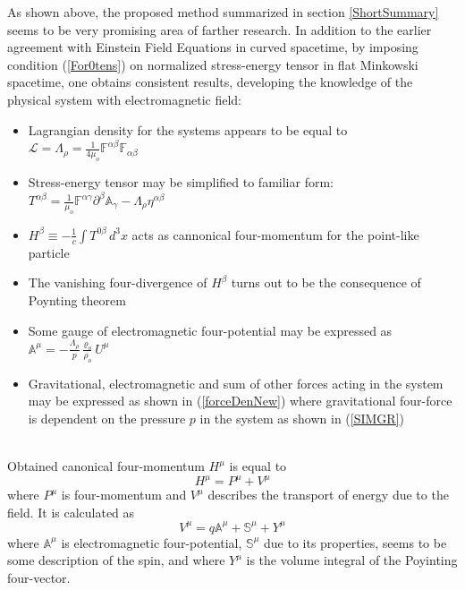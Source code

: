 \documentclass[aps,prx,preprint,groupedaddress,showkeys]{revtex4-2}
\begin{document}
As shown above, the proposed method summarized in section \ref{ShortSummary} seems to be very promising area of farther research. In addition to the earlier agreement with Einstein Field Equations in curved spacetime, by imposing condition (\ref{For0tens}) on normalized stress-energy tensor in flat Minkowski spacetime, one obtains consistent results, developing the knowledge of the physical system with electromagnetic field:
\begin{itemize}
  \item Lagrangian density for the systems appears to be equal to $\mathcal{L} = \Lambda_{\rho} = \frac{1}{4\mu_o} \mathbb{F}^{\alpha \beta} \mathbb{F}_{\alpha \beta} $
  \item Stress-energy tensor may be simplified to familiar form: $T^{\alpha \beta} = \frac{1}{\mu_o}\mathbb{F}^{\alpha \gamma} \partial^{\beta} \mathbb{A}_{\gamma} -  \Lambda_{\rho} \eta^{\alpha \beta}$
  \item $H^{\beta} \equiv - \frac{1}{c} \int T^{0 \beta} \, d^3 x$ acts as cannonical four-momentum for the point-like particle
  \item The vanishing four-divergence of $H^{\beta}$ turns out to be the consequence of Poynting theorem
  \item Some gauge of electromagnetic four-potential may be expressed as $\mathbb{A}^{\mu} = - \frac{\Lambda_{\rho}}{p} \frac{\varrho_o}{\rho_o} U^{\mu}$
  \item Gravitational, electromagnetic and sum of other forces acting in the system may be expressed as shown in (\ref{forceDenNew}) where gravitational four-force is dependent on the pressure $p$ in the system as shown in (\ref{SIMGR}) 
\end{itemize}
~\\
Obtained canonical four-momentum $H^{\mu}$ is equal to  
\begin{equation} \label{Q2}
H^{\mu} = P^{\mu} + V^{\mu} 
\end{equation}
where $P^{\mu}$ is four-momentum and $V^{\mu}$ describes the transport of energy due to the field. It is calculated as
\begin{equation} \label{QV1}
V^{\mu} = q \mathbb{A}^{\mu} + \mathbb{S}^{\mu} + Y^{\mu} 
\end{equation}
where $\mathbb{A}^{\mu}$ is electromagnetic four-potential, $\mathbb{S}^{\mu}$ due to its properties, seems to be some description of the spin, and where $Y^{\mu}$ is the volume integral of the Poyinting four-vector. \\
~\\
\end{document}
